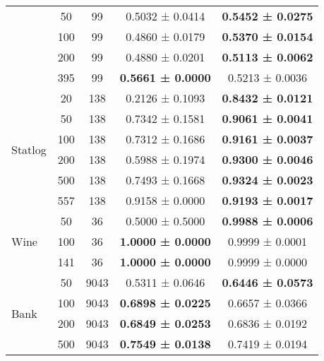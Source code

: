 \begin{table}[H]
{\begin{tabular}[H]{@{}lcccc@{}}
                              & 50          & 99   & 0.5032 ± 0.0414          & \textbf{0.5452 ± 0.0275} \\
                              & 100         & 99   & 0.4860 ± 0.0179          & \textbf{0.5370 ± 0.0154} \\
                              & 200         & 99   & 0.4880 ± 0.0201          & \textbf{0.5113 ± 0.0062} \\
                              & 395         & 99   & \textbf{0.5661 ± 0.0000} & 0.5213 ± 0.0036          \\
                              \midrule
\multirow{6}{*}{Statlog}      & 20          & 138  & 0.2126 ± 0.1093          & \textbf{0.8432 ± 0.0121} \\
                              & 50          & 138  & 0.7342 ± 0.1581          & \textbf{0.9061 ± 0.0041} \\
                              & 100         & 138  & 0.7312 ± 0.1686          & \textbf{0.9161 ± 0.0037} \\
                              & 200         & 138  & 0.5988 ± 0.1974          & \textbf{0.9300 ± 0.0046} \\
                              & 500         & 138  & 0.7493 ± 0.1668          & \textbf{0.9324 ± 0.0023} \\
                              & 557         & 138  & 0.9158 ± 0.0000          & \textbf{0.9193 ± 0.0017} \\
                              \midrule
\multirow{3}{*}{Wine}         & 50          & 36   & 0.5000 ± 0.5000          & \textbf{0.9988 ± 0.0006} \\
                              & 100         & 36   & \textbf{1.0000 ± 0.0000} & 0.9999 ± 0.0001          \\
                              & 141         & 36   & \textbf{1.0000 ± 0.0000} & 0.9999 ± 0.0000          \\
                              \midrule
\multirow{6}{*}{Bank}         & 50          & 9043 & 0.5311 ± 0.0646          & \textbf{0.6446 ± 0.0573} \\
                              & 100         & 9043 & \textbf{0.6898 ± 0.0225} & 0.6657 ± 0.0366          \\
                              & 200         & 9043 & \textbf{0.6849 ± 0.0253} & 0.6836 ± 0.0192          \\
                              & 500         & 9043 & \textbf{0.7549 ± 0.0138} & 0.7419 ± 0.0194          \\

\end{tabular}}
\end{table}
